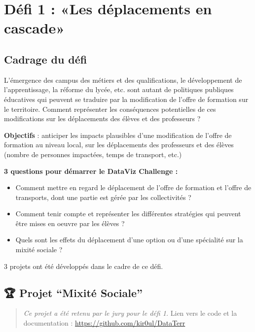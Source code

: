 \documentclass[]{book}
\begin{document}
\section{Défi 1 : «Les déplacements en
cascade»}\label{defi-1-les-deplacements-en-cascade}

\subsection{Cadrage du défi}\label{cadrage-du-defi}

L'émergence des campus des métiers et des qualifications, le
développement de l'apprentissage, la réforme du lycée, etc. sont autant
de politiques publiques éducatives qui peuvent se traduire par la
modification de l'offre de formation sur le territoire. Comment
représenter les conséquences potentielles de ces modifications sur les
déplacements des élèves et des professeurs ?

\textbf{Objectifs} : anticiper les impacts plausibles d'une modification
de l'offre de formation au niveau local, sur les déplacements des
professeurs et des élèves (nombre de personnes impactées, temps de
transport, etc.)

\textbf{3 questions pour démarrer le DataViz Challenge :}

\begin{itemize}
\item
  Comment mettre en regard le déplacement de l'offre de formation et
  l'offre de transports, dont une partie est gérée par les collectivités
  ?
\item
  Comment tenir compte et représenter les différentes stratégies qui
  peuvent être mises en oeuvre par les élèves ?
\item
  Quels sont les effets du déplacement d'une option ou d'une spécialité
  sur la mixité sociale ?
\end{itemize}

3 projets ont été développés dans le cadre de ce défi.

\subsection{\texorpdfstring{🏆 Projet ``Mixité
Sociale''}{🏆 Projet Mixité Sociale}}\label{projet-mixite-sociale}

\begin{quote}
\emph{Ce projet a été retenu par le jury pour le défi 1.} Lien vers le
code et la documentation : \url{https://github.com/kir0ul/DataTerr}
\end{quote}
\end{document}

